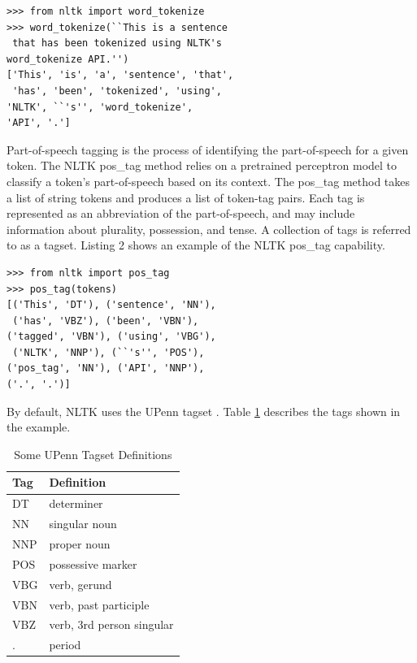 \documentclass{chi2009}
\begin{document}
\begin{lstlisting}[caption=NLTK Tokenization Example, label=tokList]
>>> from nltk import word_tokenize
>>> word_tokenize(``This is a sentence
 that has been tokenized using NLTK's 
word_tokenize API.'')
['This', 'is', 'a', 'sentence', 'that',
 'has', 'been', 'tokenized', 'using', 
'NLTK', ``'s'', 'word_tokenize', 
'API', '.']
\end{lstlisting}

Part-of-speech tagging is the process of identifying the part-of-speech for a given token.  The NLTK pos\_tag method relies on a pretrained perceptron model to classify a token's part-of-speech based on its context.  The pos\_tag method takes a list of string tokens and produces a list of token-tag pairs.  Each tag is represented as an abbreviation of the part-of-speech, and may include information about plurality, possession, and tense.  A collection of tags is referred to as a tagset.  Listing 2 shows an example of the NLTK pos\_tag capability.

\begin{lstlisting}[caption=NLTK POS Tagger Example, label=tagList]
>>> from nltk import pos_tag
>>> pos_tag(tokens)
[('This', 'DT'), ('sentence', 'NN'),
 ('has', 'VBZ'), ('been', 'VBN'), 
('tagged', 'VBN'), ('using', 'VBG'),
 ('NLTK', 'NNP'), (``'s'', 'POS'), 
('pos_tag', 'NN'), ('API', 'NNP'), 
('.', '.')]
\end{lstlisting}

By default, NLTK uses the UPenn tagset \cite{upenn_tags}.  Table \ref{tableTags} describes the tags shown in the example.

\begin{table}
\begin{center}
\begin{tabular}{ | l l | }
\hline
Tag & Definition \\
\hline
DT & determiner \\
NN & singular noun \\ 
NNP & proper noun \\ 
POS & possessive marker \\
VBG & verb, gerund \\ 
VBN & verb, past participle \\
VBZ & verb, 3rd person singular \\
. & period \\
\hline
\end{tabular}
\caption{Some UPenn Tagset Definitions}
\label{tableTags}
\end{center}
\end{table}
\end{document}
